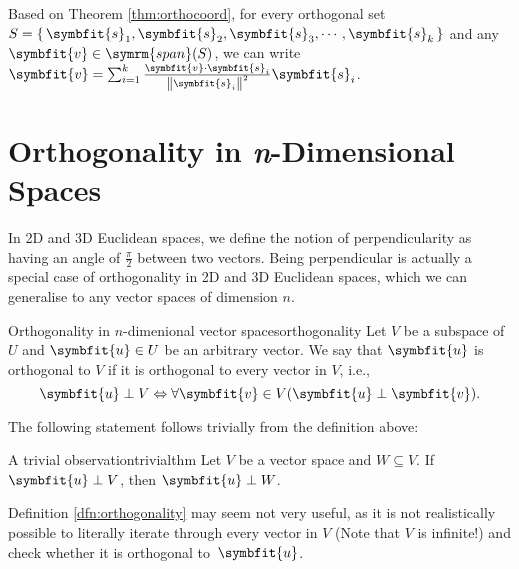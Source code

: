 \documentclass[math]{amznotes}
\theoremstyle{remark}
\begin{document}
Based on Theorem \ref{thm:orthocoord}, for every orthogonal set $S = \left\{\, \symbfit{s}_1, \symbfit{s}_2, \symbfit{s}_3, \cdots, \symbfit{s}_k \,\right\}$ and any $\symbfit{v} \in \symrm{span}(S)$, we can write $\symbfit{v} = \sum_{i = 1}^{k} \frac{\symbfit{v} \cdot \symbfit{s}_i}{\left\lVert \symbfit{s}_i \right\rVert^2}\symbfit{s}_i$.

\section{Orthogonality in \textit{n}-Dimensional Spaces}
In 2D and 3D Euclidean spaces, we define the notion of perpendicularity as having an angle of $\frac{\pi}{2}$ between two vectors. Being perpendicular is actually a special case of orthogonality in 2D and 3D Euclidean spaces, which we can generalise to any vector spaces of dimension $n$.
\begin{dfnbox}{Orthogonality in $n$-dimenional vector spaces}{orthogonality}
    Let $V$ be a subspace of $U$ and $\symbfit{u} \in U$ be an arbitrary vector. We say that $\symbfit{u}$ is orthogonal to $V$ if it is orthogonal to every vector in $V$, i.e.,
    \begin{displaymath}
        \symbfit{u} \perp V \Leftrightarrow \forall \symbfit{v} \in V(\symbfit{u} \perp \symbfit{v}).
    \end{displaymath}
\end{dfnbox}
The following statement follows trivially from the definition above:
\begin{thmbox}{A trivial observation}{trivialthm}
    Let $V$ be a vector space and $W \subseteq V$. If $\symbfit{u} \perp V$, then $\symbfit{u} \perp W$.
\end{thmbox}
Definition \ref{dfn:orthogonality} may seem not very useful, as it is not realistically possible to literally iterate through every vector in $V$ (Note that $V$ is infinite!) and check whether it is orthogonal to~$\symbfit{u}$.
\end{document}
